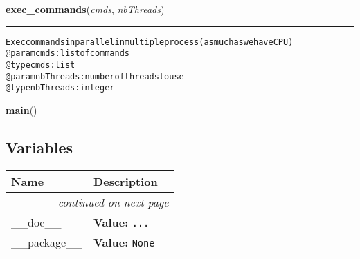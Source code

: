     \label{script-VCFmaker_SNP:exec_commands}

    \vspace{0.5ex}

\hspace{.8\funcindent}\begin{boxedminipage}{\funcwidth}

    \raggedright \textbf{exec\_commands}(\textit{cmds}, \textit{nbThreads})

    \vspace{-1.5ex}

    \rule{\textwidth}{0.5\fboxrule}
\setlength{\parskip}{2ex}
\begin{alltt}

Exec commands in parallel in multiple process (as much as we have CPU)
@param cmds: list of commands
    @type cmds: list
    @param nbThreads: number of threads to use
    @type nbThreads: integer
\end{alltt}

\setlength{\parskip}{1ex}
    \end{boxedminipage}

    \label{script-VCFmaker_SNP:main}

    \vspace{0.5ex}

\hspace{.8\funcindent}\begin{boxedminipage}{\funcwidth}

    \raggedright \textbf{main}()

\setlength{\parskip}{2ex}
\setlength{\parskip}{1ex}
    \end{boxedminipage}



  \subsection{Variables}

    \vspace{-1cm}
\hspace{\varindent}\begin{longtable}{|p{\varnamewidth}|p{\vardescrwidth}|l}
\cline{1-2}
\cline{1-2} \centering \textbf{Name} & \centering \textbf{Description}& \\
\cline{1-2}
\endhead\cline{1-2}\multicolumn{3}{r}{\small\textit{continued on next page}}\\\endfoot\cline{1-2}
\endlastfoot\raggedright \_\-\_\-d\-o\-c\-\_\-\_\- & \raggedright \textbf{Value:} 
{\tt \texttt{...}}&\\
\cline{1-2}
\raggedright \_\-\_\-p\-a\-c\-k\-a\-g\-e\-\_\-\_\- & \raggedright \textbf{Value:} 
{\tt None}&\\
\cline{1-2}
\end{longtable}

